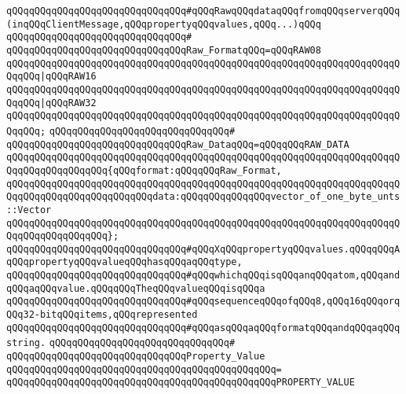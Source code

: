 \verb|qQQqqQQqqQQqqQQqqQQqqQQqqQQqqQQq#qQQqRawqQQqdataqQQqfromqQQqserverqQQq(inqQQqClientMessage,qQQqpropertyqQQqvalues,qQQq...)qQQq|\newline
\verb|qQQqqQQqqQQqqQQqqQQqqQQqqQQqqQQq#|\newline
\verb|qQQqqQQqqQQqqQQqqQQqqQQqqQQqqQQqRaw_FormatqQQq=qQQqRAW08|\newline
\verb|qQQqqQQqqQQqqQQqqQQqqQQqqQQqqQQqqQQqqQQqqQQqqQQqqQQqqQQqqQQqqQQqqQQqqQQqqQQq|\verb#|qQQqRAW16#\newline
\verb|qQQqqQQqqQQqqQQqqQQqqQQqqQQqqQQqqQQqqQQqqQQqqQQqqQQqqQQqqQQqqQQqqQQqqQQqqQQq|\verb#|qQQqRAW32#\newline
\verb|qQQqqQQqqQQqqQQqqQQqqQQqqQQqqQQqqQQqqQQqqQQqqQQqqQQqqQQqqQQqqQQqqQQqqQQqqQQq;|\newline
\verb|qQQqqQQqqQQqqQQqqQQqqQQqqQQqqQQq#|\newline
\verb|qQQqqQQqqQQqqQQqqQQqqQQqqQQqqQQqRaw_DataqQQq=qQQqqQQqRAW_DATA|\newline
\verb|qQQqqQQqqQQqqQQqqQQqqQQqqQQqqQQqqQQqqQQqqQQqqQQqqQQqqQQqqQQqqQQqqQQqqQQqqQQqqQQqqQQqqQQq{qQQqformat:qQQqqQQqRaw_Format,|\newline
\verb|qQQqqQQqqQQqqQQqqQQqqQQqqQQqqQQqqQQqqQQqqQQqqQQqqQQqqQQqqQQqqQQqqQQqqQQqqQQqqQQqqQQqqQQqqQQqqQQqdata:qQQqqQQqqQQqqQQqvector_of_one_byte_unts::Vector|\newline
\verb|qQQqqQQqqQQqqQQqqQQqqQQqqQQqqQQqqQQqqQQqqQQqqQQqqQQqqQQqqQQqqQQqqQQqqQQqqQQqqQQqqQQqqQQq};|\newline
\newline
\verb|qQQqqQQqqQQqqQQqqQQqqQQqqQQqqQQq#qQQqXqQQqpropertyqQQqvalues.qQQqqQQqAqQQqpropertyqQQqvalueqQQqhasqQQqaqQQqtype,|\newline
\verb|qQQqqQQqqQQqqQQqqQQqqQQqqQQqqQQq#qQQqwhichqQQqisqQQqanqQQqatom,qQQqandqQQqaqQQqvalue.qQQqqQQqTheqQQqvalueqQQqisqQQqa|\newline
\verb|qQQqqQQqqQQqqQQqqQQqqQQqqQQqqQQq#qQQqsequenceqQQqofqQQq8,qQQq16qQQqorqQQq32-bitqQQqitems,qQQqrepresented|\newline
\verb|qQQqqQQqqQQqqQQqqQQqqQQqqQQqqQQq#qQQqasqQQqaqQQqformatqQQqandqQQqaqQQqstring.|\newline
\verb|qQQqqQQqqQQqqQQqqQQqqQQqqQQqqQQq#|\newline
\verb|qQQqqQQqqQQqqQQqqQQqqQQqqQQqqQQqProperty_Value|\newline
\verb|qQQqqQQqqQQqqQQqqQQqqQQqqQQqqQQqqQQqqQQqqQQqqQQq=|\newline
\verb|qQQqqQQqqQQqqQQqqQQqqQQqqQQqqQQqqQQqqQQqqQQqqQQqPROPERTY_VALUE|\newline

